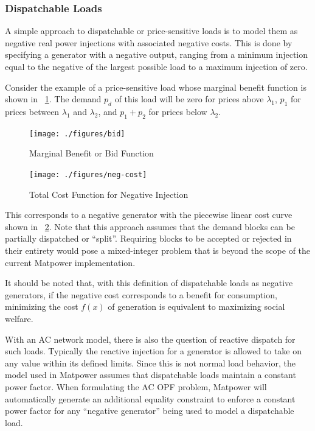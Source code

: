 \documentclass[12pt]{article}
\newcommand{\matpower}[0]{{\sc Matpower}}
\numberwithin{equation}{section}
\numberwithin{table}{section}
\numberwithin{figure}{section}
\begin{document}
\subsubsection{Dispatchable Loads}
\label{sec:dispatchable_loads}

A simple approach to dispatchable or price-sensitive loads is to model them as negative real power injections with associated negative costs. This is done by specifying a generator with a negative output, ranging from a minimum injection equal to the negative of the largest possible load to a maximum injection of zero.

Consider the example of a price-sensitive load whose marginal benefit function is shown in \figurename~\ref{fig:bid}. The demand $p_d$ of this load will be zero for prices above $\lambda_1$, $p_1$ for prices between $\lambda_1$ and $\lambda_2$, and $p_1 + p_2$ for prices below $\lambda_2$.

\begin{figure}[hbtp]
  \centering
  \texttt{[image: ./figures/bid]}
  \caption{Marginal Benefit or Bid Function}
  \label{fig:bid}
\end{figure}

\begin{figure}[hbtp]
  \centering
  \texttt{[image: ./figures/neg-cost]}
  \caption{Total Cost Function for Negative Injection}
  \label{fig:neg-cost}
\end{figure}

This corresponds to a negative generator with the piecewise linear cost curve shown in \figurename~\ref{fig:neg-cost}. Note that this approach assumes that the demand blocks can be partially dispatched or ``split''. Requiring blocks to be accepted or rejected in their entirety would pose a mixed-integer problem that is beyond the scope of the current \matpower{} implementation.

It should be noted that, with this definition of dispatchable loads as negative generators, if the negative cost corresponds to a benefit for consumption, minimizing the cost $f(x)$ of generation is equivalent to maximizing social welfare.

With an AC network model, there is also the question of reactive dispatch for such loads. Typically the reactive injection for a generator is allowed to take on any value within its defined limits. Since this is not normal load behavior, the model used in \matpower{} assumes that dispatchable loads maintain a constant power factor. When formulating the AC OPF problem, \matpower{} will automatically generate an additional equality constraint to enforce a constant power factor for any ``negative generator'' being used to model a dispatchable load.
\end{document}
